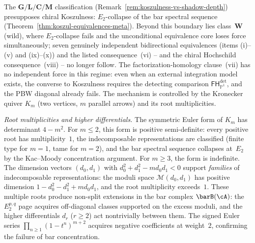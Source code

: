 \begin{remark}
\label{rem:class-w-koszul-frontier}

The $\mathbf{G}/\mathbf{L}/\mathbf{C}/\mathbf{M}$ classification
(Remark~\ref{rem:koszulness-vs-shadow-depth}) presupposes chiral
Koszulness: $E_2$-collapse of the bar spectral sequence
(Theorem~\ref{thm:koszul-equivalences-meta}). Beyond this boundary
lies class~$\mathbf{W}$ (wild), where $E_2$-collapse fails and the
unconditional equivalence core loses force simultaneously; seven
genuinely independent bidirectional equivalences (items
\textup{(i)--(v)} and \textup{(ix)--(x)}) and the listed
consequence~\textup{(vi)} -- and the chiral Hochschild
consequence~\textup{(viii)} -- no longer follow. The
factorization-homology clause~\textup{(vii)} has no independent
force in this regime: even when an external integration model exists,
the converse to Koszulness requires the detecting comparison
$\mathsf{FH}^{\mathrm{det}}_{\mathbb{P}^1}$, and the PBW diagonal
already fails.
The mechanism is controlled by the Kronecker quiver $K_m$ (two
vertices, $m$ parallel arrows) and its root multiplicities.

\emph{Root multiplicities and higher differentials.}
The symmetric Euler form of $K_m$ has determinant $4 - m^2$.
For $m \leq 2$, this form is positive semi-definite: every
positive root has multiplicity~$1$, the indecomposable
representations are classified (finite type for $m = 1$, tame
for $m = 2$), and the bar spectral sequence collapses at~$E_2$
by the Kac--Moody concentration argument. For $m \geq 3$, the
form is indefinite. The dimension vectors
$(d_0, d_1)$ with $d_0^2 + d_1^2 - m d_0 d_1 < 0$ support
\emph{families} of indecomposable representations: the moduli
space $\mathcal{M}(d_0, d_1)$ has positive dimension
$1 - d_0^2 - d_1^2 + m d_0 d_1$, and the root multiplicity
exceeds~$1$. These multiple roots produce non-split extensions
in the bar complex $\barB(\cA)$: the $E_2^{p,q}$ page acquires
off-diagonal classes supported on the excess moduli, and the
higher differentials $d_r$ ($r \geq 2$) act nontrivially between
them. The signed Euler series
$\prod_{n \geq 1}(1 - t^n)^{m+2}$ acquires negative
coefficients at weight~$2$, confirming the failure of bar
concentration.


\end{remark}
